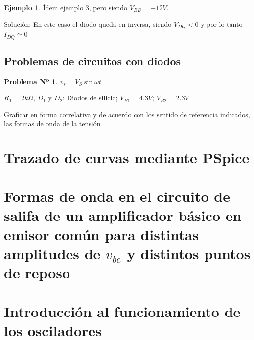 \documentclass{book} %
\theoremstyle{definition}
\newtheorem{exmp}{Ejemplo}[]
\theoremstyle{definition}
\newtheorem{probl}{Problema Nº}[]
\begin{document}
\begin{appendices}
\begin{exmp}
Ídem ejemplo 3, pero siendo $V_{BB}=-12V$.

Solución: En este caso el diodo queda en inversa, siendo $V_{DQ}<0$ y por lo tanto $I_{DQ}\simeq 0$ 

\end{exmp}

\section{Problemas de circuitos con diodos}

\begin{probl}

$v_s=V_S\sin{\omega t}$

$R_1=2k\Omega$, $D_1$ y $D_2$: Diodos de silicio; $V_{B1}=4.3V$; $V_{B2}=2.3V$ 
\vspace{0.25cm}


Graficar en forma correlativa y de acuerdo con los sentido de referencia indicados, las formas de onda de la tensión

\end{probl}





\chapter{Trazado de curvas mediante PSpice}
\chapter{Formas de onda en el circuito de salifa de un amplificador básico en emisor común para distintas amplitudes de $v_{be}$ y distintos puntos de reposo}
\chapter{Introducción al funcionamiento de los osciladores}

\end{appendices}
\end{document}
